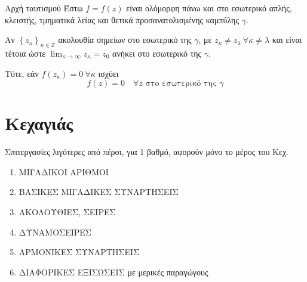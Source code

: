\documentclass[12pt,a4paper,titlepage,fleqn]{article}
\begin{document}
    \begin{theorem*}[colbacktitle=red!35!black]{Αρχή ταυτισμού}
       	Έστω \( f = f(z) \) είναι ολόμορφη πάνω και στο εσωτερικό απλής, κλειστής, τμηματικά
       	λείας και θετικά προσανατολισμένης καμπύλης \( \gamma \).
       	
       	Αν \( \left\lbrace z_\kappa \right\rbrace_{\kappa \in \mathbb Z} \) ακολουθία
       	σημείων στο εσωτερικό της \( \gamma \), με \( z_\kappa \neq z_\lambda \
       	\forall \kappa \neq \lambda \) και είναι τέτοια ώστε
       	\( \displaystyle
       	\lim_{\kappa \to \infty} z_\kappa = z_0\) ανήκει στο εσωτερικό της \( \gamma \).
       	
       	Τότε, εάν \( f(z_\kappa) = 0 \ \forall \kappa \) ισχύει
       	\[
       	f(z) = 0 \quad \forall z \text{ στο εσωτερικό της } \gamma
       	\]
    \end{theorem*}
    
    
    
    
    



	\newpage

	\part{Κεχαγιάς}
	Σπιτεργασίες λιγότερες από πέρσι, για 1 βαθμό, αφορούν μόνο το μέρος του Κεχ.
	\begin{enumerate}
		\item ΜΙΓΑΔΙΚΟΙ ΑΡΙΘΜΟΙ
		\item ΒΑΣΙΚΕΣ ΜΙΓΑΔΙΚΕΣ ΣΥΝΑΡΤΗΣΕΙΣ
		\item ΑΚΟΛΟΥΘΙΕΣ, ΣΕΙΡΕΣ
		\item ΔΥΝΑΜΟΣΕΙΡΕΣ
		\item ΑΡΜΟΝΙΚΕΣ ΣΥΝΑΡΤΗΣΕΙΣ
		\item ΔΙΑΦΟΡΙΚΕΣ ΕΞΙΣΩΣΕΙΣ με μερικές παραγώγους
	\end{enumerate}

	\setcounter{section}{0}
\end{document}
